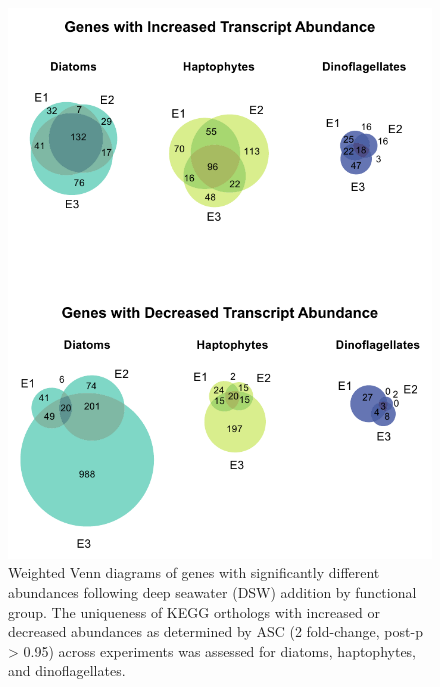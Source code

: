 \begin{figure}[p!]
  \centering
    \includegraphics[width=1\textwidth]{Images/C4_FigureS5.pdf}
    \caption[Weighted Venn diagrams of genes with significantly different abundances following deep seawater (DSW) addition by functional group]{Weighted Venn diagrams of genes with significantly different abundances following deep seawater (DSW) addition by functional group. The uniqueness of KEGG orthologs with increased or decreased abundances as determined by ASC (2 fold-change, post-p > 0.95) across experiments was assessed for diatoms, haptophytes, and dinoflagellates.}
  \label{fig:a4f5}
\end{figure}




